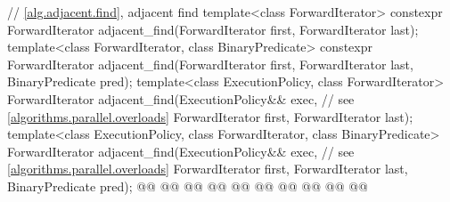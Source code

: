 \begin{codeblock}
{  // \ref{alg.adjacent.find}, adjacent find
  template<class ForwardIterator>
    constexpr ForwardIterator
      adjacent_find(ForwardIterator first, ForwardIterator last);
  template<class ForwardIterator, class BinaryPredicate>
    constexpr ForwardIterator
      adjacent_find(ForwardIterator first, ForwardIterator last,
                    BinaryPredicate pred);
  template<class ExecutionPolicy, class ForwardIterator>
    ForwardIterator
      adjacent_find(ExecutionPolicy&& exec, // see \ref{algorithms.parallel.overloads}
                    ForwardIterator first, ForwardIterator last);
  template<class ExecutionPolicy, class ForwardIterator, class BinaryPredicate>
    ForwardIterator
      adjacent_find(ExecutionPolicy&& exec, // see \ref{algorithms.parallel.overloads}
                    ForwardIterator first, ForwardIterator last,
                    BinaryPredicate pred);
  @@
    @@
        @@
      @@
                      @@
    @@
        @@
      @@
        @@
  @\added{\}}@

}
\end{codeblock}
